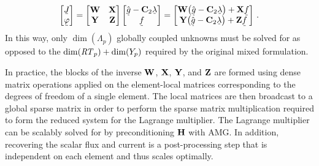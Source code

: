 \documentclass[../doc.tex]{subfiles}
\begin{document}
	\begin{equation}
		\begin{bmatrix} 
			\fevec{J} \\ \fevec{\varphi}
		\end{bmatrix}
		= \begin{bmatrix} 
			\mat{W} & \mat{X} \\ \mat{Y} & \mat{Z} 
		\end{bmatrix}
		\begin{bmatrix} 
			\hat{\fevec{g}} - \mat{C}_2 \fevec{\lambda} \\ 
			\fevec{f} 
		\end{bmatrix}
		= \begin{bmatrix} 
			\mat{W}\!\paren{\hat{\fevec{g}} - \mat{C}_2 \fevec{\lambda}} + \mat{X} \fevec{f} \\
			\mat{Y}\!\paren{\hat{\fevec{g}} - \mat{C}_2 \fevec{\lambda}} + \mat{Z}\fevec{f} 
		\end{bmatrix} \,. 
	\end{equation}
In this way, only $\dim(\Lambda_p)$ globally coupled unknowns must be solved for as opposed to the $\dim(\mathit{RT}_p) + \dim(Y_p)$ required by the original mixed formulation. 
	
In practice, the blocks of the inverse $\boldsymbol{\mathrm{W}}$, $\boldsymbol{\mathrm{X}}$, $\boldsymbol{\mathrm{Y}}$, and $\boldsymbol{\mathrm{Z}}$ are formed using dense matrix operations applied on the element-local matrices corresponding to the degrees of freedom of a single element. The local matrices are then broadcast to a global sparse matrix in order to perform the sparse matrix multiplication required to form the reduced system for the Lagrange multiplier. The Lagrange multiplier can be scalably solved for by preconditioning $\boldsymbol{\mathrm{H}}$ with AMG. In addition, recovering the scalar flux and current is a post-processing step that is independent on each element and thus scales optimally. 
\end{document}
